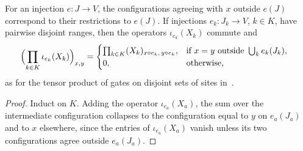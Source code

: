 \begin{lemma}
    \label{lem:siteconfig_placed_products}
    \leanok
    For an injection $e\colon J\to V$, the configurations agreeing with $x$
    outside $e(J)$ correspond to their restrictions to $e(J)$. If injections
    $e_k\colon J_k\to V$, $k\in K$, have pairwise disjoint ranges, then the
    operators $\iota_{e_k}(X_k)$ commute and
    \begin{align}
        \Bigl(\prod_{k\in K}\iota_{e_k}(X_k)\Bigr)_{x,y}
         & =\begin{cases}\prod_{k\in K}(X_k)_{x\circ e_k,\,y\circ e_k},
                   & \text{if }x=y\text{ outside }\bigcup_k e_k(J_k), \\
                0, & \text{otherwise,}\end{cases}\notag
    \end{align}
    as for the tensor product of gates on disjoint sets of sites
    in~\cite[Eqs.~(10)--(12)]{Malz2024Preparation}.
\end{lemma}
\begin{proof}
    \leanok
    Induct on $K$. Adding the operator $\iota_{e_a}(X_a)$, the sum over the
    intermediate configuration collapses to the configuration equal to $y$ on
    $e_a(J_a)$ and to $x$ elsewhere, since the entries of $\iota_{e_a}(X_a)$
    vanish unless its two configurations agree outside $e_a(J_a)$.
\end{proof}


